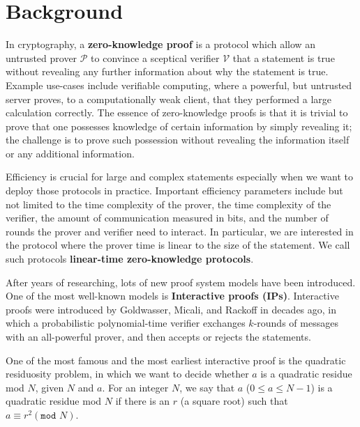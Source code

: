 \chapter{Background}


In cryptography, a \textbf{zero-knowledge proof} is a protocol which allow an untrusted prover $\mathcal{P}$ to convince a sceptical verifier $\mathcal{V}$ that a statement is true without revealing any further information about why the statement is true. 
Example use-cases include verifiable computing, where a powerful, but untrusted server proves, to a computationally weak client, that they performed a large calculation correctly. 
The essence of zero-knowledge proofs is that it is trivial to prove that one possesses knowledge of certain information by simply revealing it; the challenge is to prove such possession without revealing the information itself or any additional information.


Efficiency is crucial for large and complex statements especially when we want to deploy those protocols in practice. Important efficiency parameters include but not limited to the time complexity of the prover, the time complexity of the verifier, the amount of communication measured in bits, and the number of rounds the prover and verifier need to interact. In particular, we are interested in the protocol where the prover time is linear to the size of the statement. We call such protocols \textbf{linear-time zero-knowledge protocols}.

After years of researching, lots of new proof system models have been introduced. 
One of the most well-known models is \textbf{Interactive proofs (IPs)}. Interactive proofs were introduced by Goldwasser, Micali, and Rackoff in \cite{DBLP:books/acm/19/GoldwasserMR19} decades ago, in which a probabilistic polynomial-time verifier exchanges $k$-rounds of messages with an all-powerful prover, and then accepts or rejects the statements. 

One of the most famous and the most earliest interactive proof is the quadratic residuosity problem, in which we want to decide whether $a$ is a quadratic residue mod $N$, given $N$ and $a$. For an integer $N$, we say that $a$ ($0 \le a \le N - 1$) is a quadratic residue mod $N$ if there is an $r$ (a square root) such that $ a \equiv r^2 ( \texttt{mod } N)$. 

